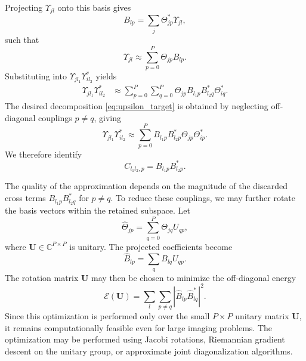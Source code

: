 \documentclass{article}
\begin{document}
Projecting $\Upsilon_{jl}$ onto this basis gives
\begin{equation}
    B_{lp}
    =
    \sum_j
    \Theta^*_{jp}\Upsilon_{jl},
    \label{eq:B_projection}
\end{equation}
such that
\begin{equation}
    \Upsilon_{jl}
    \approx
    \sum_{p=0}^{P}
    \Theta_{jp}B_{lp}.
\end{equation}
Substituting into
$\Upsilon_{jl_1}\Upsilon^*_{il_2}$ yields
\begin{align}
    \Upsilon_{jl_1}\Upsilon^*_{il_2}
    &\approx
    \sum_{p=0}^{P}\sum_{q=0}^{P}
    \Theta_{jp}
    B_{l_1p}
    B^*_{l_2q}
    \Theta^*_{iq}.
\end{align}
The desired decomposition \eqref{eq:upsilon_target} is obtained by
neglecting off-diagonal couplings $p\neq q$, giving
\begin{equation}
    \Upsilon_{jl_1}\Upsilon^*_{il_2}
    \approx
    \sum_{p=0}^{P}
    B_{l_1p}B^*_{l_2p}
    \Theta_{jp}\Theta^*_{ip}.
\end{equation}
We therefore identify
\begin{equation}
    C_{l_1l_2,p}
    =
    B_{l_1p}B^*_{l_2p}.
\end{equation}

The quality of the approximation depends on the magnitude of the
discarded cross terms
$B_{l_1p}B^*_{l_2q}$ for $p\neq q$.
To reduce these couplings, we may further rotate the basis vectors
within the retained subspace.
Let
\begin{equation}
    \hat{\Theta}_{jp}
    =
    \sum_{q=0}^{P}
    \Theta_{jq}U_{qp},
\end{equation}
where $\mathbf{U}\in\mathbb{C}^{P\times P}$ is unitary.
The projected coefficients become
\begin{equation}
    \hat{B}_{lp}
    =
    \sum_q
    B_{lq}U_{qp}.
\end{equation}
The rotation matrix $\mathbf{U}$ may then be chosen to minimize the
off-diagonal energy
\begin{equation}
    \mathcal{E}(\mathbf{U})
    =
    \sum_l
    \sum_{p\neq q}
    |\hat{B}_{lp}\hat{B}^*_{lq}|^2.
\end{equation}
Since this optimization is performed only over the small
$P\times P$ unitary matrix $\mathbf{U}$, it remains computationally
feasible even for large imaging problems.
The optimization may be performed using Jacobi rotations,
Riemannian gradient descent on the unitary group,
or approximate joint diagonalization algorithms.
\end{document}
